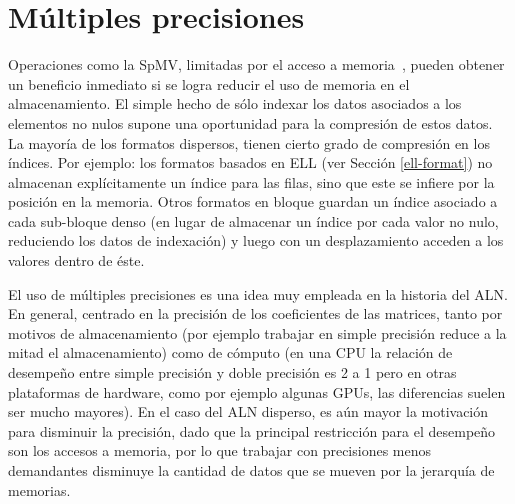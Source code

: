 





\section{Múltiples precisiones}\label{multiple-precision}


Operaciones como la SpMV, limitadas por el acceso a memoria~\cite{Goumas2008}, pueden obtener un beneficio inmediato si se logra reducir el uso de memoria en el almacenamiento. El simple hecho de sólo indexar los datos asociados a los elementos no nulos supone una oportunidad para la compresión de estos datos. La mayoría de los formatos dispersos, tienen cierto grado de compresión en los índices. Por ejemplo:  los formatos basados en ELL (ver Sección \ref{ell-format}) no almacenan explícitamente un índice para las filas, sino que este se infiere por la posición en la memoria. Otros formatos en bloque guardan un índice asociado a cada sub-bloque denso (en lugar de almacenar un índice por cada valor no  nulo, reduciendo los datos de indexación) y luego con un desplazamiento acceden a los valores dentro de éste.

El uso de múltiples precisiones es una idea muy empleada en la historia del ALN. En general, centrado en la precisión de los coeficientes de las matrices, tanto por motivos de almacenamiento (por ejemplo trabajar en simple precisión reduce a la mitad el almacenamiento) como de cómputo (en una CPU la relación de desempeño entre simple precisión y doble precisión es 2 a 1 pero en otras plataformas de hardware, como por ejemplo algunas GPUs, las diferencias suelen ser mucho mayores).
En el caso del ALN disperso, es aún mayor la motivación para disminuir la precisión, dado que la principal restricción para el desempeño son los accesos a memoria, por lo que trabajar con precisiones menos demandantes disminuye la cantidad de datos que se mueven por la jerarquía de memorias.

